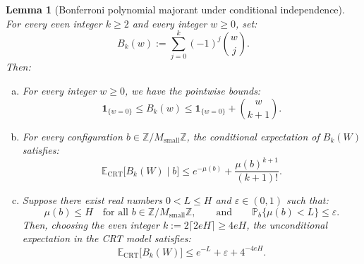 \documentclass[11pt, a4paper]{article}
\theoremstyle{plain}
\newtheorem{lemma}[theorem]{Lemma}
\theoremstyle{definition}
\newcommand{\Z}{\mathbb{Z}}
\newcommand{\Pbb}{\mathbb{P}}
\newcommand{\Ebb}{\mathbb{E}}
\newcommand{\ind}{\mathbf{1}}
\begin{document}
\begin{lemma}[Bonferroni polynomial majorant under conditional independence]\label{lem:bonferroni_CRT}
For every even integer $k \ge 2$ and every integer $w \ge 0$, set:
\begin{equation}\label{eq:polynome_Bk}
B_k(w) := \sum_{j=0}^k (-1)^j \binom{w}{j}.
\end{equation}
Then:
\begin{enumerate}[(a)]
    \item For every integer $w \ge 0$, we have the pointwise bounds:
    \begin{equation}\label{eq:ineg_ponctuelle_Bk}
    \ind_{\{w=0\}} \le B_k(w) \le \ind_{\{w=0\}} + \binom{w}{k+1}.
    \end{equation}
    \item For every configuration $b \in \Z / M_{\mathrm{small}} \Z$, the conditional expectation of $B_k(W)$ satisfies:
    \begin{equation}\label{eq:esperance_cond_Bk_sec}
    \Ebb_{\mathrm{CRT}}\big[B_k(W) \mid b\big] \le e^{-\mu(b)} + \frac{\mu(b)^{k+1}}{(k+1)!}.
    \end{equation}
    \item Suppose there exist real numbers $0 < L \le H$ and $\varepsilon \in (0, 1)$ such that:
    \[
    \mu(b) \le H \quad \text{for all } b \in \Z / M_{\mathrm{small}} \Z, \qquad \text{and} \qquad \Pbb_b\big\{\mu(b) < L\big\} \le \varepsilon.
    \]
    Then, choosing the even integer $k := 2\lceil 2eH \rceil \ge 4eH$, the unconditional expectation in the CRT model satisfies:
    \begin{equation}\label{eq:borne_globale_CRT_Bk}
    \Ebb_{\mathrm{CRT}}\big[B_k(W)\big] \le e^{-L} + \varepsilon + 4^{-4eH}.
    \end{equation}
\end{enumerate}
\end{lemma}
\end{document}
